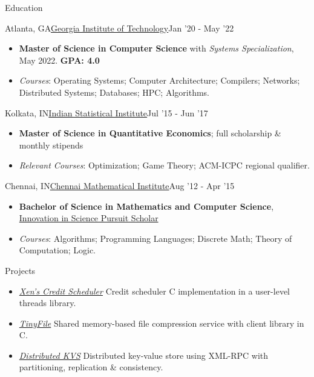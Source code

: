 \documentclass[]{mcdowellcv}
\begin{document}
    \begin{cvsection}{Education}
        \begin{cvsubsection}{Atlanta, GA}{\href{https://www.gatech.edu/}{Georgia Institute of Technology}}{Jan '20 - May '22}
            \begin{itemize}
                \item \textbf{Master of Science in Computer Science} with \textit{Systems Specialization}, May 2022. \textbf{GPA: 4.0}
                \item \textit{Courses}: Operating Systems; Computer Architecture; Compilers; Networks; Distributed Systems; Databases; HPC; Algorithms.
            \end{itemize}
        \end{cvsubsection}
        \begin{cvsubsection}{Kolkata, IN}{\href{https://www.isical.ac.in/}{Indian Statistical Institute}}{Jul '15 - Jun '17}
            \begin{itemize}
                \item \textbf{Master of Science in Quantitative Economics}; full scholarship \& monthly stipends
                \item \textit{Relevant Courses}: Optimization; Game Theory; ACM-ICPC regional qualifier.
            \end{itemize}
        \end{cvsubsection}
        \begin{cvsubsection}{Chennai, IN}{\href{https://www.cmi.ac.in/}{Chennai Mathematical Institute}}{Aug '12 - Apr '15}
            \begin{itemize}
                \item \textbf{Bachelor of Science in Mathematics and Computer Science}, \href{https://www.online-inspire.gov.in/}{Innovation in Science Pursuit Scholar}
                \item \textit{Courses}: Algorithms; Programming Languages; Discrete Math; Theory of Computation; Logic.
            \end{itemize}
        \end{cvsubsection}
    \end{cvsection}

    \begin{cvsection}{Projects}
        \begin{cvsubsection}{}{}{}
            \begin{itemize}
                \item \href{https://github.com/saubhik/thread-scheduler}{\textit{Xen's Credit Scheduler}} Credit scheduler C implementation in a user-level threads library.
                \item \href{https://github.com/saubhik/tinyfile}{\textit{TinyFile}} Shared memory-based file compression service with client library in C.
                \item \href{https://github.com/saubhik/GTStore}{\textit{Distributed KVS}} Distributed key-value store using XML-RPC with partitioning, replication \& consistency.
            \end{itemize}
        \end{cvsubsection}{}{}{}
    \end{cvsection}
\end{document}
